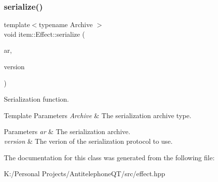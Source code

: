 \subsubsection{\texorpdfstring{serialize()}{serialize()}}
{\footnotesize\ttfamily template$<$typename Archive $>$ \\
void item\+::\+Effect\+::serialize (\begin{DoxyParamCaption}\item[{Archive \&}]{ar,  }\item[{unsigned int const}]{version }\end{DoxyParamCaption})\hspace{0.3cm}{\ttfamily [inline]}}



Serialization function. 


\begin{DoxyTemplParams}{Template Parameters}
{\em Archive} & The serialization archive type. \\
\hline
\end{DoxyTemplParams}

\begin{DoxyParams}{Parameters}
{\em ar} & The serialization archive. \\
\hline
{\em version} & The verion of the serialization protocol to use. \\
\hline
\end{DoxyParams}


The documentation for this class was generated from the following file\+:\begin{DoxyCompactItemize}
\item 
K\+:/\+Personal Projects/\+Antitelephone\+Q\+T/src/effect.\+hpp\end{DoxyCompactItemize}

